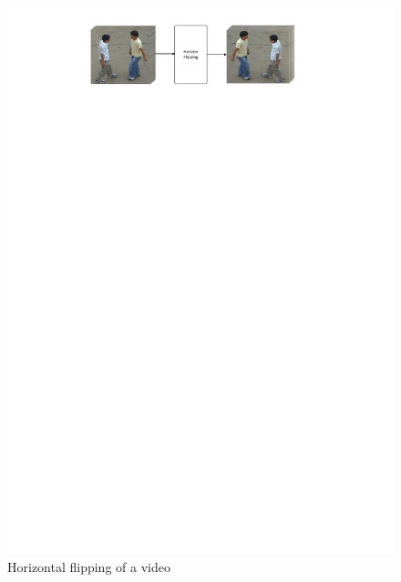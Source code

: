\begin{figure}
	\includegraphics[trim=2cm 25.5cm 0cm 1cm]{fig01/flip.pdf}
	\caption{Horizontal flipping of a video}
	\label{fig:flip_4}
\end{figure} 
